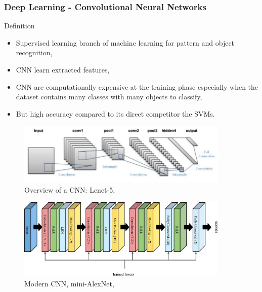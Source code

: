 \documentclass{beamer}
\begin{document}
\begin{frame}[allowframebreaks]
\frametitle{Deep Learning - Convolutional Neural Networks }

\begin{block}{Definition}

\begin{itemize}
\item Supervised learning branch of machine learning for pattern and object recognition,
\item CNN learn extracted features,
\item CNN are computationally expensive at the training phase especially when the dataset contains many classes with many objects to classify,
\item But high accuracy compared to its direct competitor the SVMs.
\end{itemize}

\end{block}

\begin{figure}[h!]
    \centering
    \includegraphics[width=0.9\textwidth]{Pictures/lenet_architecture}
    \caption{Overview of a CNN: Lenet-5, \cite{Lecun98gradient-basedlearning}}
\end{figure}

\begin{figure}[h!]
	\centering
	\includegraphics[width=0.9\textwidth]{Pictures/deep}
	\caption{Modern CNN, mini-AlexNet, \cite{NIPS2012_4824,Amato2017327}}
\end{figure}

\framebreak


\end{frame}
\end{document}
